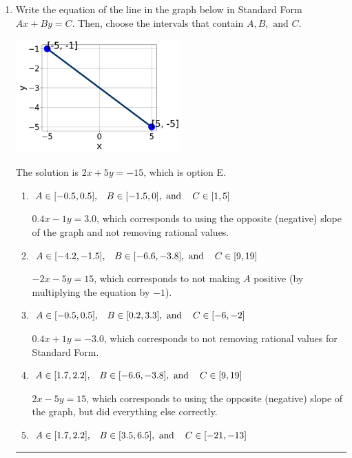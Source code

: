 \documentclass{extbook}[14pt]
\newcommand{\litem}[1]{\item #1

\rule{\textwidth}{0.4pt}}
\begin{document}
\begin{enumerate}\litem{
Write the equation of the line in the graph below in Standard Form $Ax+By=C$. Then, choose the intervals that contain $A, B, \text{ and } C$.

\begin{center}
    \includegraphics[width=0.5\textwidth]{../Figures/linearGraphToStandardC.png}
\end{center}


The solution is \( 2x + 5y = -15 \), which is option E.\begin{enumerate}[label=\Alph*.]
\item \( A \in [-0.5, 0.5], \hspace{3mm} B \in [-1.5, 0], \text{ and } \hspace{3mm} C \in [1, 5] \)

 $0.4x - 1y = 3.0$, which corresponds to using the opposite (negative) slope of the graph and not removing rational values.
\item \( A \in [-4.2, -1.5], \hspace{3mm} B \in [-6.6, -3.8], \text{ and } \hspace{3mm} C \in [9, 19] \)

 $-2x - 5y = 15$, which corresponds to not making $A$ positive (by multiplying the equation by $-1$).
\item \( A \in [-0.5, 0.5], \hspace{3mm} B \in [0.2, 3.3], \text{ and } \hspace{3mm} C \in [-6, -2] \)

 $0.4x + 1y = -3.0$, which corresponds to not removing rational values for Standard Form.
\item \( A \in [1.7, 2.2], \hspace{3mm} B \in [-6.6, -3.8], \text{ and } \hspace{3mm} C \in [9, 19] \)

 $2x - 5y = 15$, which corresponds to using the opposite (negative) slope of the graph, but did everything else correctly.
\item \( A \in [1.7, 2.2], \hspace{3mm} B \in [3.5, 6.5], \text{ and } \hspace{3mm} C \in [-21, -13] \)


\end{enumerate}}
\end{enumerate}
\end{document}
